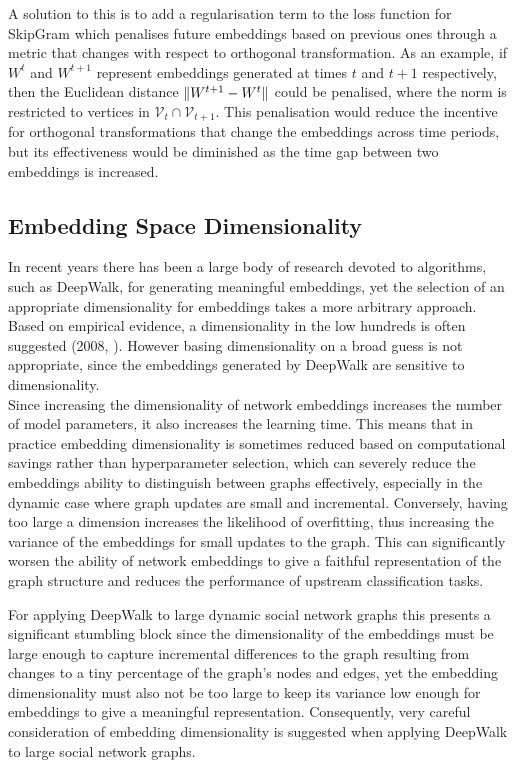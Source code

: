 \documentclass[a4paper]{article}
\renewcommand{\V}{\mathcal V}
\begin{document}
A solution to this is to add a regularisation term to the loss function for SkipGram which penalises future embeddings based on previous ones through a metric that changes with respect to orthogonal
transformation. As an example, if $W^t$ and $W^{t+1}$ represent embeddings generated at times $t$ and $t+1$ respectively, then the Euclidean distance $\lVert W^{t+1} - W^t\rVert$ could be penalised,
where the norm is restricted to vertices in $\V_t \cap \V_{t+1}$. This penalisation would reduce the incentive for orthogonal transformations that change the embeddings across time periods, but its
effectiveness would be diminished as the time gap between two embeddings is increased.
\subsection{Embedding Space Dimensionality}
In recent years there has been a large body of research devoted to algorithms, such as DeepWalk, for generating meaningful embeddings, yet the selection of an appropriate dimensionality for embeddings
takes a more arbitrary approach. Based on empirical evidence, a dimensionality in the low hundreds is often suggested (2008, \cite{bradford2008}). However basing dimensionality on a broad guess is not appropriate, since the embeddings generated by DeepWalk are sensitive to dimensionality.\\
Since increasing the dimensionality of network embeddings increases the number of model parameters, it also increases the learning time. This means that
in practice embedding dimensionality is sometimes reduced based on computational savings rather than hyperparameter selection, which can severely reduce the embeddings ability to
distinguish between graphs effectively, especially in the dynamic case where graph updates are small and incremental.
Conversely, having too large a dimension increases the likelihood of overfitting, thus increasing the variance of the embeddings for small updates to the graph. This can significantly
worsen the ability of network embeddings to give a faithful representation of the graph structure and reduces the performance of upstream classification
tasks.

For applying DeepWalk to large dynamic social network graphs this presents a significant stumbling block since the dimensionality of the embeddings must be large enough to capture incremental differences
to the graph resulting from changes to a tiny percentage of the graph's nodes and edges, yet the embedding dimensionality must also not be too large to keep its variance low enough for embeddings to
give a meaningful representation. Consequently, very careful consideration of embedding dimensionality is suggested when applying DeepWalk to large social network graphs.
\end{document}
